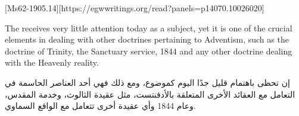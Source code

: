 [Ms62-1905.14][https://egwwritings.org/read?panels=p14070.10026020]


The  receives very little attention today as a subject, yet it is one of the crucial elements in dealing with other doctrines pertaining to Adventism, such as the doctrine of Trinity, the Sanctuary service, 1844 and any other doctrine dealing with the Heavenly reality.


إن  تحظى باهتمام قليل جدًا اليوم كموضوع، ومع ذلك فهي أحد العناصر الحاسمة في التعامل مع العقائد الأخرى المتعلقة بالأدفنتست، مثل عقيدة الثالوث، وخدمة المقدس، وعام 1844 وأي عقيدة أخرى تتعامل مع الواقع السماوي.


